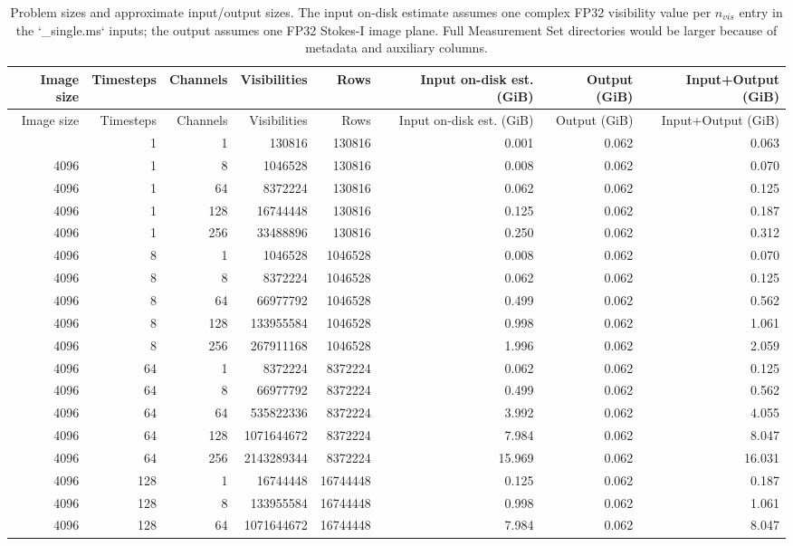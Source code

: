 \begin{longtable}{rrrrrrrr}
\caption{Problem sizes and approximate input/output sizes. The input on-disk estimate assumes one complex FP32 visibility value per $n_{vis}$ entry in the `_single.ms` inputs; the output assumes one FP32 Stokes-I image plane. Full Measurement Set directories would be larger because of metadata and auxiliary columns.}\\
\toprule
Image size & Timesteps & Channels & Visibilities & Rows & Input on-disk est. (GiB) & Output (GiB) & Input+Output (GiB)\\
\midrule
\endfirsthead
\toprule
Image size & Timesteps & Channels & Visibilities & Rows & Input on-disk est. (GiB) & Output (GiB) & Input+Output (GiB)\\
\midrule
\endhead
\bottomrule
\endfoot
4096 & 1 & 1 & 130816 & 130816 & 0.001 & 0.062 & 0.063\\
4096 & 1 & 8 & 1046528 & 130816 & 0.008 & 0.062 & 0.070\\
4096 & 1 & 64 & 8372224 & 130816 & 0.062 & 0.062 & 0.125\\
4096 & 1 & 128 & 16744448 & 130816 & 0.125 & 0.062 & 0.187\\
4096 & 1 & 256 & 33488896 & 130816 & 0.250 & 0.062 & 0.312\\
4096 & 8 & 1 & 1046528 & 1046528 & 0.008 & 0.062 & 0.070\\
4096 & 8 & 8 & 8372224 & 1046528 & 0.062 & 0.062 & 0.125\\
4096 & 8 & 64 & 66977792 & 1046528 & 0.499 & 0.062 & 0.562\\
4096 & 8 & 128 & 133955584 & 1046528 & 0.998 & 0.062 & 1.061\\
4096 & 8 & 256 & 267911168 & 1046528 & 1.996 & 0.062 & 2.059\\
4096 & 64 & 1 & 8372224 & 8372224 & 0.062 & 0.062 & 0.125\\
4096 & 64 & 8 & 66977792 & 8372224 & 0.499 & 0.062 & 0.562\\
4096 & 64 & 64 & 535822336 & 8372224 & 3.992 & 0.062 & 4.055\\
4096 & 64 & 128 & 1071644672 & 8372224 & 7.984 & 0.062 & 8.047\\
4096 & 64 & 256 & 2143289344 & 8372224 & 15.969 & 0.062 & 16.031\\
4096 & 128 & 1 & 16744448 & 16744448 & 0.125 & 0.062 & 0.187\\
4096 & 128 & 8 & 133955584 & 16744448 & 0.998 & 0.062 & 1.061\\
4096 & 128 & 64 & 1071644672 & 16744448 & 7.984 & 0.062 & 8.047\\

\end{longtable}
